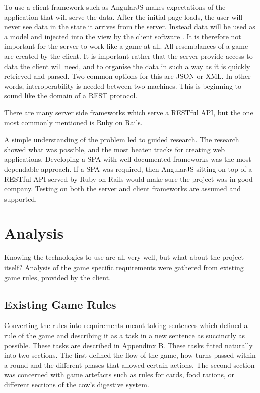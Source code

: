 To use a client framework such as AngularJS makes expectations of the application that will serve the data. After the initial page loads, the user will never see data in the state it arrives from the server. Instead data will be used as a model and injected into the view by the client software \cite{SPABook}. It is therefore not important for the server to work like a game at all. All resemblances of a game are created by the client. It is important rather that the server provide access to data the client will need, and to organise the data in such a way as it is quickly retrieved and parsed. Two common options for this are JSON or XML. In other words, interoperability is needed between two machines. This is beginning to sound like the domain of a REST protocol.
	
There are many server side frameworks which serve a RESTful API, but the one most commonly mentioned \cite{BestSerPlat} is Ruby on Rails.
	
A simple understanding of the problem led to guided research. The research showed what was possible, and the most beaten tracks for creating web applications. Developing a SPA with well documented frameworks was the most dependable approach. If a SPA was required, then AngularJS sitting on top of a RESTful API served by Ruby on Rails would make sure the project was in good company. Testing on both the server and client frameworks are assumed and supported.

\section{Analysis}
Knowing the technologies to use are all very well, but what about the project itself? Analysis of the game specific requirements were gathered from existing game rules, provided by the client. 
	
\subsection{Existing Game Rules}
Converting the rules into requirements meant taking sentences which defined a rule of the game and describing it as a task in a new sentence as succinctly as possible. These tasks are described in Appendinx B. These tasks fitted naturally into two sections. The first defined the flow of the game, how turns passed within a round and the different phases that allowed certain actions. The second section was concerned with game artefacts such as rules for cards, food rations, or different sections of the cow's digestive system.
	
